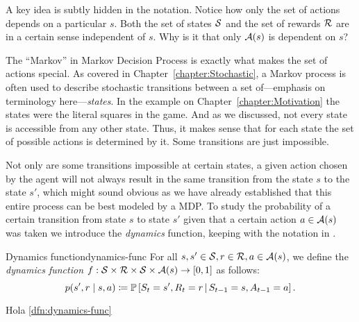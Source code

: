 A key idea is subtly hidden in the notation. Notice how only 
the set of actions depends on a particular $s$. Both the set of 
states $\mathcal{S}$ and the set of rewards $\mathcal{R}$ are in a 
certain sense independent of $s$. Why is it that only 
$\mathcal{A}(s)$ is dependent on $s$?

The ``Markov'' in Markov Decision Process is exactly what makes 
the set of actions special. As covered in 
Chapter~\ref{chapter:Stochastic}, a Markov process is often 
used to describe stochastic transitions between a set 
of---emphasis on terminology here---\textit{states}. In the 
example on Chapter~\ref{chapter:Motivation} the states were the 
literal squares in the game. And as we discussed, not every 
state is accessible from any other state. Thus, it makes sense 
that for each state the set of possible actions is determined 
by it. Some transitions are just impossible.

Not only are some transitions impossible at certain states, a 
given action chosen by the agent will not always result in the 
same transition from the state $s$ to the state $s'$, which 
might sound obvious as we have already established that this 
entire process can be best modeled by a MDP. To study the 
probability of a certain transition from state $s$ to state 
$s'$ given that a certain action $a \in \mathcal{A}(s)$ was taken 
we introduce the \textit{dynamics} function, keeping with the 
notation in \cite{SuttonBarto}.

\begin{dfn}{Dynamics function}{dynamics-func}
	For all $s, s' \in \mathcal{S}, r \in \mathcal{R}, a \in 
	\mathcal{A}(s)$, we define the \emph{dynamics function} $f: 
	\mathcal{S} \times \mathcal{R} \times \mathcal{S} \times \mathcal{A}(s) 
	\to [0, 1]$ as follows:
	\begin{equation*}
		p(s', r \mid s, a) \coloneqq \mathbb{P}\left[S_t = s', R_t = r 
		\,\middle\vert\, S_{t-1} = s, A_{t-1} = a\right].
	\end{equation*}
\end{dfn}

Hola \ref{dfn:dynamics-func}
